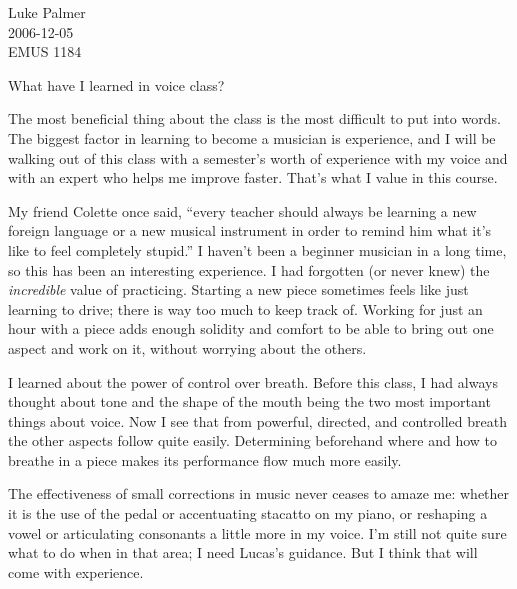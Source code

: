 \documentclass[12pt]{article}
\begin{document}
\noindent Luke Palmer \\
2006-12-05 \\
EMUS 1184

\begin{center}
\large{What have I learned in voice class?}
\end{center}

The most beneficial thing about the class is the most difficult to put
into words.  The biggest factor in learning to become a musician is
experience, and I will be walking out of this class with a semester's
worth of experience with my voice and with an expert who helps me
improve faster.  That's what I value in this course.

My friend Colette once said, ``every teacher should always be learning a
new foreign language or a new musical instrument in order to remind him
what it's like to feel completely stupid.''   I haven't been a beginner
musician in a long time, so this has been an interesting experience.  I
had forgotten (or never knew) the \textit{incredible} value of
practicing.  Starting a new piece sometimes feels like just learning to
drive; there is way too much to keep track of.  Working for just an hour
with a piece adds enough solidity and comfort to be able to bring out
one aspect and work on it, without worrying about the others.

I learned about the power of control over breath.  Before this class, I
had always thought about tone and the shape of the mouth being the two
most important things about voice.  Now I see that from powerful,
directed, and controlled breath the other aspects follow quite easily.
Determining beforehand where and how to breathe in a piece makes its
performance flow much more easily.

The effectiveness of small corrections in music never ceases to amaze
me: whether it is the use of the pedal or accentuating stacatto on my
piano, or reshaping a vowel or articulating consonants a little more in
my voice.  I'm still not quite sure what to do when in that area; I need
Lucas's guidance.  But I think that will come with experience.
\end{document}
